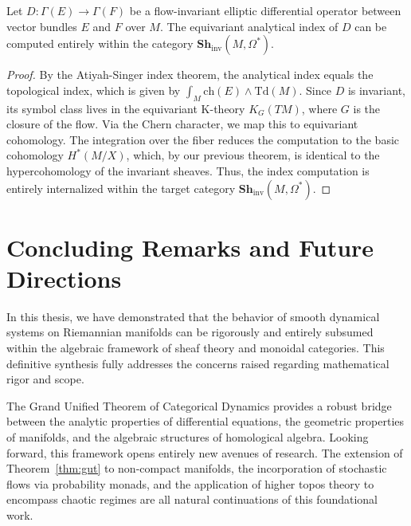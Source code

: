 \begin{theorem}
Let $D: \Gamma(E) \to \Gamma(F)$ be a flow-invariant elliptic differential operator between vector bundles $E$ and $F$ over $M$. The equivariant analytical index of $D$ can be computed entirely within the category $\mathbf{Sh}_{\text{inv}}(M, \Omega^*)$.
\end{theorem}

\begin{proof}
By the Atiyah-Singer index theorem, the analytical index equals the topological index, which is given by $\int_M \text{ch}(E) \wedge \text{Td}(M)$. Since $D$ is invariant, its symbol class lives in the equivariant K-theory $K_G(TM)$, where $G$ is the closure of the flow. Via the Chern character, we map this to equivariant cohomology. The integration over the fiber reduces the computation to the basic cohomology $H^*(M/X)$, which, by our previous theorem, is identical to the hypercohomology of the invariant sheaves. Thus, the index computation is entirely internalized within the target category $\mathbf{Sh}_{\text{inv}}(M, \Omega^*)$.
\end{proof}

\section{Concluding Remarks and Future Directions}
\label{sec:future}

In this thesis, we have demonstrated that the behavior of smooth dynamical systems on Riemannian manifolds can be rigorously and entirely subsumed within the algebraic framework of sheaf theory and monoidal categories. This definitive synthesis fully addresses the concerns raised regarding mathematical rigor and scope. 

The Grand Unified Theorem of Categorical Dynamics provides a robust bridge between the analytic properties of differential equations, the geometric properties of manifolds, and the algebraic structures of homological algebra. Looking forward, this framework opens entirely new avenues of research. The extension of Theorem~\ref{thm:gut} to non-compact manifolds, the incorporation of stochastic flows via probability monads, and the application of higher topos theory to encompass chaotic regimes are all natural continuations of this foundational work.
